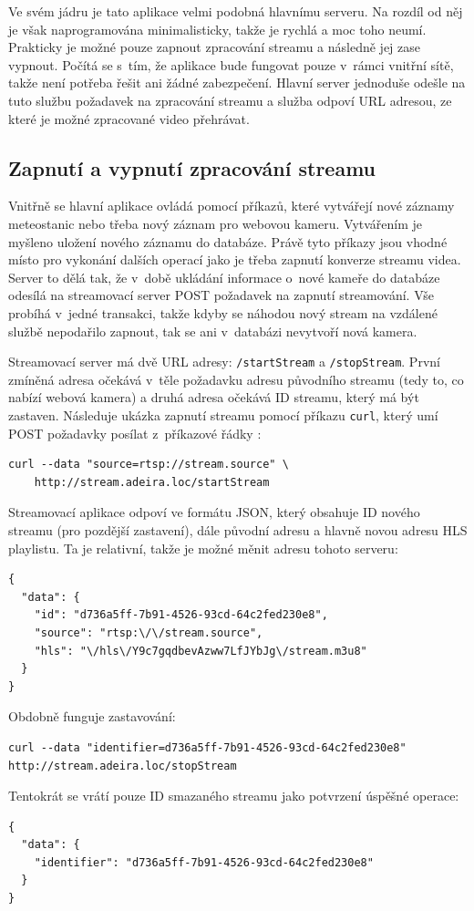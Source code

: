 Ve svém jádru je tato aplikace velmi podobná hlavnímu serveru. Na rozdíl od něj je však naprogramována minimalisticky, takže je rychlá a moc toho neumí. Prakticky je možné pouze zapnout zpracování streamu a následně jej zase vypnout. Počítá se s~tím, že aplikace bude fungovat pouze v~rámci vnitřní sítě, takže není potřeba řešit ani žádné zabezpečení. Hlavní server jednoduše odešle na tuto službu požadavek na zpracování streamu a služba odpoví URL adresou, ze které je možné zpracované video přehrávat.

\subsection{Zapnutí a vypnutí zpracování streamu}
Vnitřně se hlavní aplikace ovládá pomocí příkazů, které vytvářejí nové zá\-zna\-my meteostanic nebo třeba nový záznam pro webovou kameru. Vytvářením je myšleno uložení nového záznamu do databáze. Právě tyto příkazy jsou vhodné místo pro vykonání dalších operací jako je třeba zapnutí konverze streamu videa. Server to dělá tak, že v~době ukládání informace o~nové kameře do databáze odesílá na streamovací server POST požadavek na zapnutí streamování. Vše probíhá v~jedné transakci, takže kdyby se náhodou nový stream na vzdálené službě nepodařilo zapnout, tak se ani v~databázi nevytvoří nová kamera.

Streamovací server má dvě URL adresy: \texttt{/startStream} a \texttt{/stopStream}. První zmíněná adresa očekává v~těle požadavku adresu původního streamu (tedy to, co nabízí webová kamera) a druhá adresa očekává ID streamu, který má být zastaven. Následuje ukázka zapnutí streamu pomocí příkazu \texttt{curl}, který umí POST požadavky posílat z~příkazové řádky \cite{curl}:

\begin{verbatim}
curl --data "source=rtsp://stream.source" \
    http://stream.adeira.loc/startStream
\end{verbatim}

Streamovací aplikace odpoví ve formátu JSON, který obsahuje ID nového streamu (pro pozdější zastavení), dále původní adresu a hlavně novou adresu HLS playlistu. Ta je relativní, takže je možné měnit adresu tohoto serveru:

\begin{verbatim}
{
  "data": {
    "id": "d736a5ff-7b91-4526-93cd-64c2fed230e8",
    "source": "rtsp:\/\/stream.source",
    "hls": "\/hls\/Y9c7gqdbevAzww7LfJYbJg\/stream.m3u8"
  }
}
\end{verbatim}
%
Obdobně funguje zastavování:
%
\begin{verbatim}
curl --data "identifier=d736a5ff-7b91-4526-93cd-64c2fed230e8" http://stream.adeira.loc/stopStream
\end{verbatim}
%
Tentokrát se vrátí pouze ID smazaného streamu jako potvrzení úspěšné operace:
%
\begin{verbatim}
{
  "data": {
    "identifier": "d736a5ff-7b91-4526-93cd-64c2fed230e8"
  }
}
\end{verbatim}

